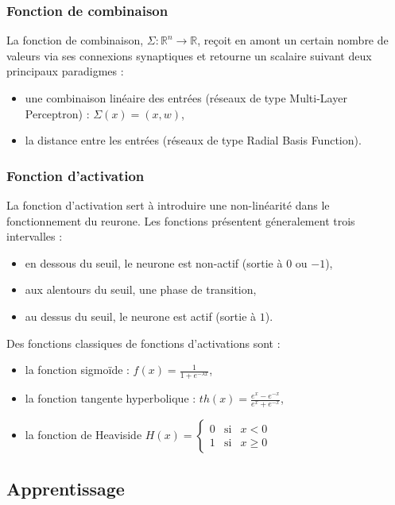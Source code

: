 		\subsubsection{Fonction de combinaison}

La fonction de combinaison, $\Sigma : \mathbb{R}^n \rightarrow \mathbb{R}$, re\c coit en amont un certain nombre de valeurs via ses connexions synaptiques et retourne un scalaire suivant deux principaux paradigmes :
\begin{itemize}
	\item une combinaison lin\'eaire des entr\'ees (r\'eseaux de type Multi-Layer Perceptron) : $\Sigma(x) = (x,w)$,
	\item la distance entre les entr\'ees (r\'eseaux de type Radial Basis Function).
\end{itemize}

		\subsubsection{Fonction d'activation}

La fonction d'activation sert \`a introduire une non-lin\'earit\'e dans le fonctionnement du reurone. Les fonctions pr\'esentent g\'eneralement trois intervalles :
\begin{itemize}
	\item en dessous du seuil, le neurone est non-actif (sortie \`a $0$ ou $-1$),
	\item aux alentours du seuil, une phase de transition,
	\item au dessus du seuil, le neurone est actif (sortie \`a $1$).
\end{itemize}

Des fonctions classiques de fonctions d'activations sont :
\begin{itemize}
	\item la fonction sigmo\"ide : $f(x)=\frac{1}{1+e^{-\lambda x}}$,
	\item la fonction tangente hyperbolique : $th(x)=\frac{e^x-e^{-x}}{e^x+e^{-x}}$,
	\item la fonction de Heaviside $H(x)=\left\{\begin{matrix} 0 & \mathrm{si} & x < 0 \\ 1 & \mathrm{si} & x \ge 0 \end{matrix}\right.$
\end{itemize}

	\subsection{Apprentissage}

